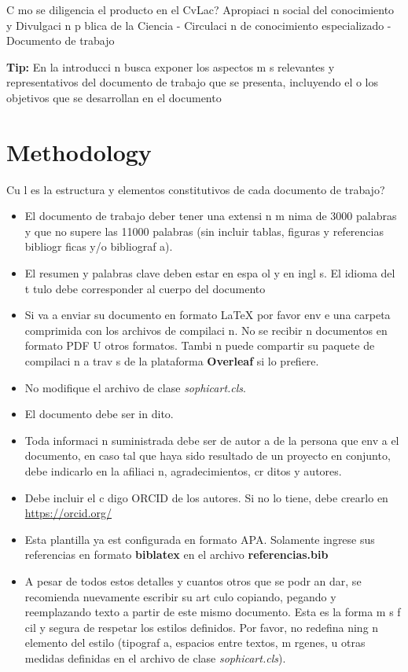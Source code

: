 \documentclass{article}
\begin{document}
 C mo se diligencia el producto en el CvLac?
Apropiaci n social del conocimiento y Divulgaci n p blica de la Ciencia - Circulaci n de conocimiento especializado - Documento de trabajo

\textbf{Tip:} En la introducci n busca exponer los aspectos m s relevantes y representativos del documento de trabajo que se presenta, incluyendo el o los objetivos que se desarrollan en el documento

\section{Methodology}

 Cu l es la estructura y elementos constitutivos de cada documento de trabajo?

\begin{itemize}
  \item El documento de trabajo deber  tener una extensi n m nima de 3000 palabras y que no supere las 11000 palabras (sin incluir tablas, figuras y referencias bibliogr ficas y/o bibliograf a).
  \item El resumen y palabras clave deben estar en espa ol y en ingl s. El idioma del t tulo debe corresponder al cuerpo del documento
  \item Si va a enviar su documento en formato \LaTeX\xspace  por favor env e una carpeta comprimida con los archivos de compilaci n. No se recibir n documentos en formato PDF U otros formatos. Tambi n puede compartir su paquete de compilaci n a trav s de la plataforma \textbf{Overleaf} si lo prefiere.
  \item No modifique el archivo de clase \textit{sophicart.cls}.
  \item El documento debe ser in dito. 
  \item Toda informaci n suministrada debe ser de autor a de la persona que env a el documento, en caso tal que haya sido resultado de un proyecto en conjunto, debe indicarlo en la afiliaci n, agradecimientos, cr ditos y autores. 
  \item Debe incluir el c digo ORCID de los autores. Si no lo tiene, debe crearlo en \url{https://orcid.org/}
  \item Esta plantilla ya est  configurada en formato APA. Solamente ingrese sus referencias en formato \textbf{biblatex} en el archivo \textbf{referencias.bib}
  \item A pesar de todos estos detalles y cuantos otros que se podr an dar, se recomienda nuevamente escribir su art culo copiando, pegando y reemplazando texto a partir de este mismo documento. Esta es la forma m s f cil y segura de respetar los estilos definidos. Por favor, no redefina ning n elemento del estilo (tipograf a, espacios entre textos, m rgenes, u otras medidas definidas en el archivo de clase \textit{sophicart.cls}).
  
\end{itemize}
\end{document}
